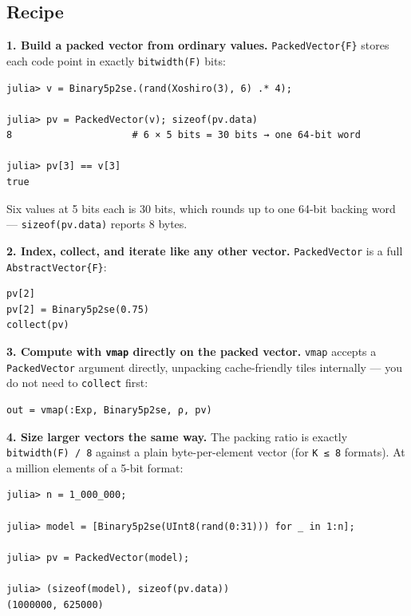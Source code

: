 \subsection{Recipe}



\label{111379208343275940-dup2}{}


\textbf{1. Build a packed vector from ordinary values.} \texttt{PackedVector\{F\}} stores each code point in exactly \texttt{bitwidth(F)} bits:




\nopagebreak[4]
\begin{verbatim}
julia> v = Binary5p2se.(rand(Xoshiro(3), 6) .* 4);

julia> pv = PackedVector(v); sizeof(pv.data)
8                     # 6 × 5 bits = 30 bits → one 64-bit word

julia> pv[3] == v[3]
true
\end{verbatim}



Six values at 5 bits each is 30 bits, which rounds up to one 64-bit backing word — \texttt{sizeof(pv.data)} reports 8 bytes.



\textbf{2. Index, collect, and iterate like any other vector.} \texttt{PackedVector} is a full \texttt{AbstractVector\{F\}}:




\nopagebreak[4]
\begin{verbatim}
pv[2]
pv[2] = Binary5p2se(0.75)
collect(pv)
\end{verbatim}



\textbf{3. Compute with \texttt{vmap} directly on the packed vector.} \texttt{vmap} accepts a \texttt{PackedVector} argument directly, unpacking cache-friendly tiles internally — you do not need to \texttt{collect} first:




\nopagebreak[4]
\begin{verbatim}
out = vmap(:Exp, Binary5p2se, ρ, pv)
\end{verbatim}



\textbf{4. Size larger vectors the same way.} The packing ratio is exactly \texttt{bitwidth(F) / 8} against a plain byte-per-element vector (for \texttt{K ≤ 8} formats). At a million elements of a 5-bit format:




\nopagebreak[4]
\begin{verbatim}
julia> n = 1_000_000;

julia> model = [Binary5p2se(UInt8(rand(0:31))) for _ in 1:n];

julia> pv = PackedVector(model);

julia> (sizeof(model), sizeof(pv.data))
(1000000, 625000)
\end{verbatim}



